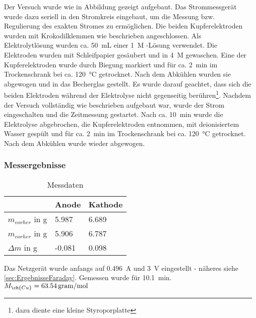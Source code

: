 \documentclass{article}
\begin{document}
        Der Versuch wurde wie in Abbildung gezeigt aufgebaut. Das Strommessgerät wurde dazu seriell in den Stromkreis eingebaut, um die Messung bzw. Regulierung des exakten Stromes zu ermöglichen. Die beiden Kupferelektroden wurden mit Krokodilklemmen wie beschrieben angeschlossen. Als Elektrolytlösung wurden ca. \SI[mode=text]{50}{\milli\liter} einer \SI[mode=text]{1}{M} -Lösung verwendet. Die Elektroden wurden mit Schleifpapier gesäubert und in \SI[mode=text]{4}{M}  gewaschen. Eine der Kupferelektroden wurde durch Biegung markiert und für ca. \SI[mode=text]{2}{\minute} im Trockenschrank bei ca. \SI[mode=text]{120}{\degreeCelsius} getrocknet. Nach dem Abkühlen wurden sie abgewogen und in das Becherglas gestellt. Es wurde darauf geachtet, dass sich die beiden Elektroden während der Elektrolyse nicht gegenseitig berühren\footnote{dazu diente eine kleine Styroporplatte}. Nachdem der Versuch vollständig wie beschrieben aufgebaut war, wurde der Strom eingeschalten und die Zeitmessung gestartet. Nach ca. \SI[mode=text]{10}{\minute} wurde die Elektrolyse abgebrochen, die Kupferelektroden entnommen, mit deionisiertem Wasser gespült und für ca. \SI[mode=text]{2}{\minute} im Trockenschrank bei ca. \SI[mode=text]{120}{\degreeCelsius} getrocknet. Nach dem Abkühlen wurde wieder abgewogen. 
        
      \subsubsection{Messergebnisse} \label{sec:MessergebnisseFaraday}
      
        \begin{table}[H]
          \centering
          \caption[Messdaten der Bestimmung der Faraday Konstante, Quelle: Autor]{Messdaten}
          \label{tab:MessdatenFaraday}
            \begin{tabular}{@{}l|ll@{}}
              \toprule
                & Anode & Kathode \\ \midrule
               $m_{vorher}$ in g & 5.987 & 6.689 \\
               $m_{vorher}$ in g & 5.906 & 6.787 \\
               $\Delta m$ in g & -0.081 & 0.098 \\ \bottomrule
            \end{tabular}
        \end{table}
        
        Das Netzgerät wurde anfangs auf \SI[mode=text]{0.496}{\ampere} und \SI[mode=text]{3}{\volt} eingestellt - näheres siehe \ref{sec:ErgebnisseFaraday}. Gemessen wurde für \SI[mode=text]{10.1}{\minute}. $M_{\ch{Cu}}=\SI[mode=text]{63.54}{gram\per\mole}$
        
\end{document}
